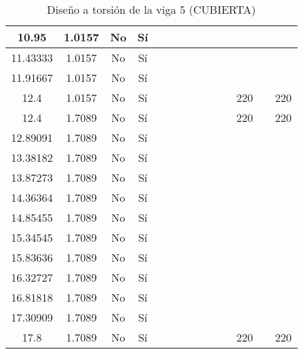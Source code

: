 \begin{table}[H]
{\begin{tabular}{|c|c|c|c|c|c|c|c|c|c|c|c|c|c|}
\hline
10.95 & 1.0157 & No  & Sí  &     &     &     &     &     &     &     &     &     &  \bigstrut\\
\hline
11.43333 & 1.0157 & No  & Sí  &     &     &     &     &     &     &     &     &     &  \bigstrut\\
\hline
11.91667 & 1.0157 & No  & Sí  &     &     &     &     &     &     &     &     &     &  \bigstrut\\
\hline
12.4 & 1.0157 & No  & Sí  &     &     &     &     &     &     &     & 220 &     & 220 \bigstrut\\
\hline
12.4 & 1.7089 & No  & Sí  &     &     &     &     &     &     &     & 220 &     & 220 \bigstrut\\
\hline
12.89091 & 1.7089 & No  & Sí  &     &     &     &     &     &     &     &     &     &  \bigstrut\\
\hline
13.38182 & 1.7089 & No  & Sí  &     &     &     &     &     &     &     &     &     &  \bigstrut\\
\hline
13.87273 & 1.7089 & No  & Sí  &     &     &     &     &     &     &     &     &     &  \bigstrut\\
\hline
14.36364 & 1.7089 & No  & Sí  &     &     &     &     &     &     &     &     &     &  \bigstrut\\
\hline
14.85455 & 1.7089 & No  & Sí  &     &     &     &     &     &     &     &     &     &  \bigstrut\\
\hline
15.34545 & 1.7089 & No  & Sí  &     &     &     &     &     &     &     &     &     &  \bigstrut\\
\hline
15.83636 & 1.7089 & No  & Sí  &     &     &     &     &     &     &     &     &     &  \bigstrut\\
\hline
16.32727 & 1.7089 & No  & Sí  &     &     &     &     &     &     &     &     &     &  \bigstrut\\
\hline
16.81818 & 1.7089 & No  & Sí  &     &     &     &     &     &     &     &     &     &  \bigstrut\\
\hline
17.30909 & 1.7089 & No  & Sí  &     &     &     &     &     &     &     &     &     &  \bigstrut\\
\hline
17.8 & 1.7089 & No  & Sí  &     &     &     &     &     &     &     & 220 &     & 220 \bigstrut\\
\hline
\end{tabular}%

  



  }
      \caption{Diseño a torsión de la viga 5 (CUBIERTA) }
  \label{tab:T VG5 CUB }%
\end{table}%
